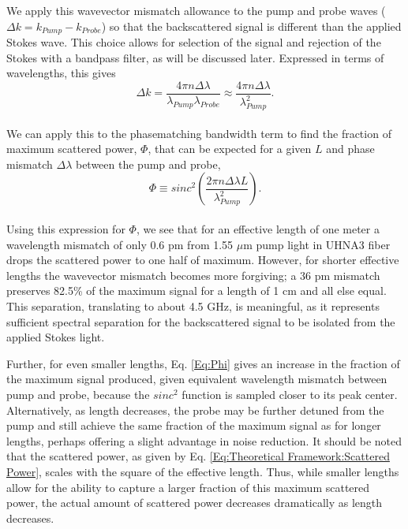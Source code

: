 \documentclass[%
  reprint,
  superscriptaddress,
  amsmath,amssymb,
  aps,
  prapplied,
]{revtex4-2}
\begin{document}
We apply this wavevector mismatch allowance to the pump and probe waves ($\Delta k = k_{Pump} - k_{Probe}$) so that the backscattered signal is different than the applied Stokes wave. This choice allows for selection of the signal and rejection of the Stokes with a bandpass filter, as will be discussed later. Expressed in terms of wavelengths, this gives
\\
\begin{equation}
  \Delta k = \frac{4\pi n\Delta\lambda}{\lambda_{Pump}\lambda_{Probe}} \approx \frac{4\pi n\Delta\lambda}{\lambda_{Pump}^{2}}.
\end{equation}
\\
We can apply this to the phasematching bandwidth term to find the fraction of maximum scattered power, $\Phi$, that can be expected for a given $L$ and phase mismatch $\Delta\lambda$ between the pump and probe,
\\
\begin{equation}
  \Phi \equiv sinc^{2}\left(\frac{2\pi n\Delta\lambda L}{\lambda_{Pump}^{2}}\right).
  \label{Eq:Phi}
\end{equation}
\\
Using this expression for $\Phi$, we see that for an effective length of one meter a wavelength mismatch of only 0.6 pm from 1.55 $\mu$m pump light in UHNA3 fiber drops the scattered power to one half of maximum. However, for shorter effective lengths the wavevector mismatch becomes more forgiving; a 36 pm mismatch preserves 82.5\% of the maximum signal for a length of 1 cm and all else equal. This separation, translating to about 4.5 GHz, is meaningful, as it represents sufficient spectral separation for the backscattered signal to be isolated from the applied Stokes light.

Further, for even smaller lengths, Eq. \ref{Eq:Phi} gives an increase in the fraction of the maximum signal produced, given equivalent wavelength mismatch between pump and probe, because the $sinc^{2}$ function is sampled closer to its peak center. Alternatively, as length decreases, the probe may be further detuned from the pump and still achieve the same fraction of the maximum signal as for longer lengths, perhaps offering a slight advantage in noise reduction. It should be noted that the scattered power, as given by Eq. \ref{Eq:Theoretical Framework:Scattered Power}, scales with the square of the effective length. Thus, while smaller lengths allow for the ability to capture a larger fraction of this maximum scattered power, the actual amount of scattered power decreases dramatically as length decreases.
\end{document}
